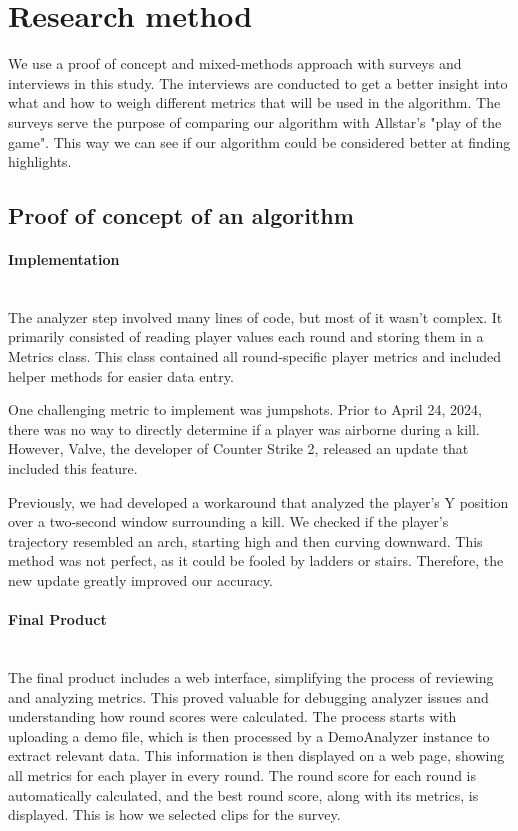 \section{Research method}
We use a proof of concept and mixed-methods approach with surveys and interviews in this study. The interviews are conducted to get a better insight into what and how to weigh different metrics that will be used in the algorithm. The surveys serve the purpose of comparing our algorithm with Allstar's "play of the game". This way we can see if our algorithm could be considered better at finding highlights.
\subsection{Proof of concept of an algorithm}
\paragraph{Implementation}
\mbox{}\\

The analyzer step involved many lines of code, but most of it wasn't complex. It primarily consisted of reading player values each round and storing them in a Metrics class. This class contained all round-specific player metrics and included helper methods for easier data entry.

One challenging metric to implement was \gls{jumpshot}s. Prior to April 24, 2024, there was no way to directly determine if a player was airborne during a kill. However, Valve, the developer of Counter Strike 2, released an update that included this feature\cite{onTheOtherHandReleaseNotes}.

Previously, we had developed a workaround that analyzed the player's Y position over a two-second window surrounding a kill. We checked if the player's trajectory resembled an arch, starting high and then curving downward. This method was not perfect, as it could be fooled by ladders or stairs. Therefore, the new update greatly improved our accuracy.
\paragraph{Final Product}\mbox{}\\
The final product includes a web interface, simplifying the process of reviewing and analyzing metrics. This proved valuable for debugging analyzer issues and understanding how round scores were calculated. The process starts with uploading a demo file, which is then processed by a DemoAnalyzer instance to extract relevant data. This information is then displayed on a web page, showing all metrics for each player in every round. The round score for each round is automatically calculated, and the best round score, along with its metrics, is displayed. This is how we selected clips for the survey.

